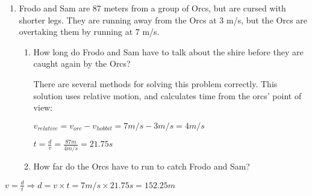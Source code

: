 \documentclass[letterpaper, 12pt]{article}
\begin{document}
\begin{enumerate}
\item Frodo and Sam are 87 meters from a group of Orcs, but are cursed with shorter legs. They are running away from the Orcs at 3 m/s, but the Orcs are overtaking them by running at 7 m/s.  
\begin{enumerate}
\item How long do Frodo and Sam have to talk about the shire before they are caught again by the Orcs?\color{red} 

There are several methods for solving this problem correctly.  This solution uses relative motion, and calculates time from the orcs' point of view: $ $
	 \begin{center}
	$ v_{relative} = v_{orc} - v_{hobbit} = 7 m/s - 3 m/s = 4 m/s $
	
\vspace{.05in}
	$t = \frac{d}{v} = \frac{87m}{4 m/s} = 21.75 s$
	
\end{center}



\color{black}

\item How far do the Orcs have to run to catch Frodo and Sam?
\end{enumerate}


	
\end{enumerate}
 \color{red}
	 \begin{center}
$	v = \frac{d}{t} \Longrightarrow d = v \times t = 7 m/s \times 21.75 s = 152.25 m $

	
\end{center}



\color{black}
\end{document}
